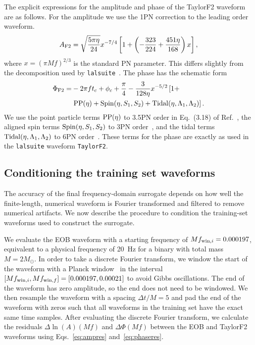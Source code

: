 \documentclass[prd,aps,letter,twocolumn,floatfix,notitlepage,nofootinbib]{revtex4-1}
\begin{document}
The explicit expressions for the amplitude and phase of the TaylorF2 waveform are as follows. For the amplitude we use the 1PN correction to the leading order waveform.
\begin{equation}
A_{\rm F2} = \sqrt{\frac{5\pi\eta}{24}} x^{-7/4} \left[ 1 + \left(-\frac{323}{224} + \frac{451\eta}{168} \right)x \right],
\end{equation}
where $x=(\pi M f)^{2/3}$ is the standard PN parameter. This differs slightly from the decomposition used by \texttt{lalsuite}~\cite{lal}. The phase has the schematic form
\begin{align}
\Phi_{\rm F2} =& -2\pi f t_c + \phi_c + \frac{\pi}{4} - \frac{3}{128\eta}x^{-5/2} \left[1 + \right. \\
                        & \left. {\rm PP}(\eta) + {\rm Spin}(\eta, S_1, S_2) + {\rm Tidal}(\eta, \Lambda_1, \Lambda_2)  \right].
\end{align}
We use the point particle terms ${\rm PP}(\eta)$ to 3.5PN order in Eq.~(3.18) of Ref.~\cite{BuonannoIyerOchsner2009}, the aligned spin terms ${\rm Spin}(\eta, S_1, S_2)$ to 3PN order~\cite{BoheMarsatBlanchet2013}, and the tidal terms ${\rm Tidal}(\eta, \Lambda_1, \Lambda_2)$ to 6PN order~\cite{VinesFlanaganHinderer2011}. These terms for the phase are exactly as used in the \texttt{lalsuite} waveform \texttt{TaylorF2}.


\subsection{Conditioning the training set waveforms}
\label{sec:condition}

The accuracy of the final frequency-domain surrogate depends on how well the finite-length, numerical waveform is Fourier transformed and filtered to remove numerical artifacts. We now describe the procedure to condition the training-set waveforms used to construct the surrogate.

We evaluate the EOB waveform with a starting frequency of $Mf_{{\rm win}, i}=0.000197$, equivalent to a physical frequency of 20~Hz for a binary with total mass $M=2M_\odot$. In order to take a discrete Fourier transform, we window the start of the waveform with a Planck window~\cite{McKechanRobinsonSathyaprakash2010} in the interval $[Mf_{{\rm win}, i}, Mf_{{\rm win}, f}] = [0.000197, 0.00021]$ to avoid Gibbs oscillations. The end of the waveform has zero amplitude, so the end does not need to be windowed. We then resample the waveform with a spacing $\Delta t/M = 5$ and pad the end of the waveform with zeros such that all waveforms in the training set have the exact same time samples. After evaluating the discrete Fourier transform, we calculate the residuals $\Delta\ln(A)(Mf)$ and $\Delta\Phi(Mf)$ between the EOB and TaylorF2 waveforms using Eqs.~\eqref{eq:ampres} and~\eqref{eq:phaseres}. 
\end{document}
